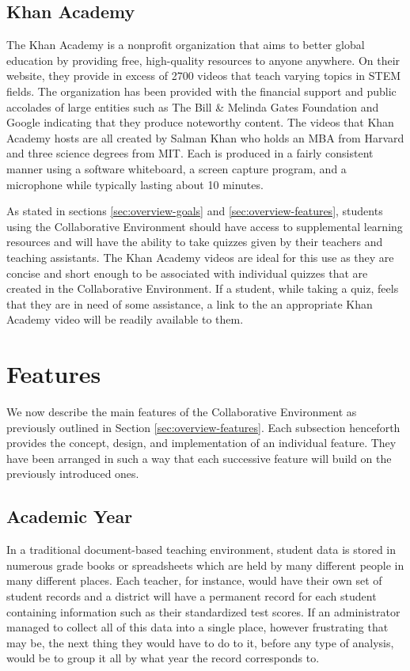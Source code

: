 \subsection{Khan Academy}
The Khan Academy is a nonprofit organization that aims to better global education by providing free, high-quality resources to anyone anywhere. \cite{khan-website-about} On their website, they provide in excess of 2700 videos that teach varying topics in STEM fields. The organization has been provided with the financial support and public accolades of large entities such as The Bill \& Melinda Gates Foundation and Google \cite{khan-wiki-sources} indicating that they produce noteworthy content. The videos that Khan Academy hosts are all created by Salman Khan who holds an MBA from Harvard and three science degrees from MIT. Each is produced in a fairly consistent manner using a software whiteboard, a screen capture program, and a microphone while typically lasting about 10 minutes.

As stated in sections \ref{sec:overview-goals} and \ref{sec:overview-features}, students using the Collaborative Environment should have access to supplemental learning resources and will have the ability to take quizzes given by their teachers and teaching assistants. The Khan Academy videos are ideal for this use as they are concise and short enough to be associated with individual quizzes that are created in the Collaborative Environment. If a student, while taking a quiz, feels that they are in need of some assistance, a link to the an appropriate Khan Academy video will be readily available to them.

\section{Features}
\label{sec:features}
We now describe the main features of the Collaborative Environment as previously outlined in Section \ref{sec:overview-features}. Each subsection henceforth provides the concept, design, and implementation of an individual feature. They have been arranged in such a way that each successive feature will build on the previously introduced ones.

\subsection{Academic Year}
\label{subsec:design-year}
In a traditional document-based teaching environment, student data is stored in numerous grade books  or spreadsheets which are held by many different people in many different places. Each teacher, for instance, would have their own set of student records and a district will have a permanent record for each student containing information such as their standardized test scores. If an administrator managed to collect all of this data into a single place, however frustrating that may be, the next thing they would have to do to it, before any type of analysis, would be to group it all by what year the record corresponds to.

